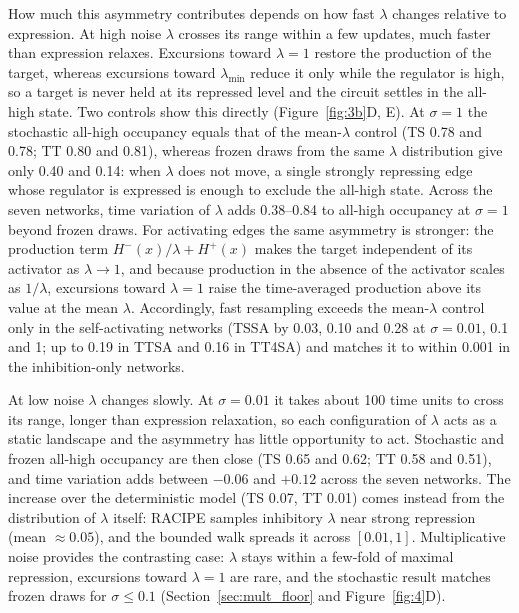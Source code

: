 \documentclass[11pt]{article}
\providecommand{\DIFaddtex}[1]{{\protect\color{red}#1}} %
\providecommand{\DIFdeltex}[1]{} %
\providecommand{\DIFaddbegin}{} %
\providecommand{\DIFaddend}{} %
\providecommand{\DIFdelbegin}{} %
\providecommand{\DIFdelend}{} %
\providecommand{\DIFadd}[1]{\texorpdfstring{\DIFaddtex{#1}}{#1}} %
\providecommand{\DIFdel}[1]{\texorpdfstring{\DIFdeltex{#1}}{}} %
\providecommand{\DIFaddincludegraphics}[2][]{\DIFOincludegraphics[#1]{#2}} %
\providecommand{\DIFdelincludegraphics}[2][]{}
\DeclareRobustCommand{\DIFaddbegin}{\DIFOaddbegin \let\includegraphics\DIFaddincludegraphics} %
\DeclareRobustCommand{\DIFaddend}{\DIFOaddend \let\includegraphics\DIFOincludegraphics} %
\DeclareRobustCommand{\DIFdelbegin}{\DIFOdelbegin \let\includegraphics\DIFdelincludegraphics} %
\DeclareRobustCommand{\DIFdelend}{\DIFOaddend \let\includegraphics\DIFOincludegraphics} %
\begin{document}
\DIFadd{How much this asymmetry contributes depends on how fast $\lambda$ changes relative to expression. At high noise $\lambda$ crosses its range within a few updates, much faster than expression relaxes. Excursions toward $\lambda = 1$ restore the production of the target, whereas excursions toward $\lambda_{\min}$ reduce it only while the regulator }\DIFaddend is high, \DIFdelbegin \DIFdel{and has essentially no effect when the regulator is low ($H^{-}(x)\!\approx\!1$). An excursion toward de-repression ($\lambda=1$)therefore always ``fires, '' whereas an excursion toward repression fires only when }\DIFdelend \DIFaddbegin \DIFadd{so a target is never held at its repressed level and }\DIFaddend the \DIFdelbegin \DIFdel{partner node happens to be expressed. This unconditional-up / conditional-down asymmetry is the microscopic origin of the enhancement. We see this clearly in the Boolean approximation of node expression (i.e., each node can only take two expression levels }\DIFdelend \DIFaddbegin \DIFadd{circuit settles in the all-high state. Two controls show this directly (Figure~\ref{fig:3b}D, E). At $\sigma = 1$ the stochastic all-high occupancy equals that of the mean-$\lambda$ control (TS 0.78 and 0.78; TT 0.80 and 0.81), whereas frozen draws from the same $\lambda$ distribution give only 0.40 and 0.14: when $\lambda$ does not move, a single strongly repressing edge whose regulator is expressed is enough to exclude the all-high state. Across the seven networks, time variation of $\lambda$ adds 0.38--0.84 to all-high occupancy at $\sigma = 1$ beyond frozen draws. For activating edges the same asymmetry is stronger: the production term $H^{-}(x)/\lambda + H^{+}(x)$ makes the target independent of its activator as $\lambda \to 1$, and because production in the absence of the activator scales as $1/\lambda$, excursions toward $\lambda = 1$ raise the time-averaged production above its value at the mean $\lambda$. Accordingly, fast resampling exceeds the mean-$\lambda$ control only in the self-activating networks (TSSA by 0.03, 0.10 and 0.28 at $\sigma = 0.01$, 0.1 and 1; up to 0.19 in TTSA and 0.16 in TT4SA) and matches it to within 0.001 in the inhibition-only networks.
}

\DIFadd{At low noise $\lambda$ changes slowly. At $\sigma = 0.01$ it takes about 100 time units to cross its range, longer than expression relaxation, so each configuration of $\lambda$ acts as a static landscape and the asymmetry has little opportunity to act. Stochastic and frozen all-high occupancy are then close (TS 0.65 and 0.62; TT 0.58 and 0.51), and time variation adds between $-0.06$ and $+0.12$ across the seven networks. The increase over the deterministic model (TS 0.07, TT 0.01) comes instead from the distribution of $\lambda$ itself: RACIPE samples inhibitory $\lambda$ near strong repression (mean $\approx 0.05$), and the bounded walk spreads it across $[0.01, 1]$. Multiplicative noise provides the contrasting case: $\lambda$ stays within a few-fold of maximal repression, excursions toward $\lambda = 1$ are rare, and the stochastic result matches frozen draws for $\sigma \leq 0.1$ (Section~\ref{sec:mult_floor} and Figure~\ref{fig:4}D).
}
\end{document}
